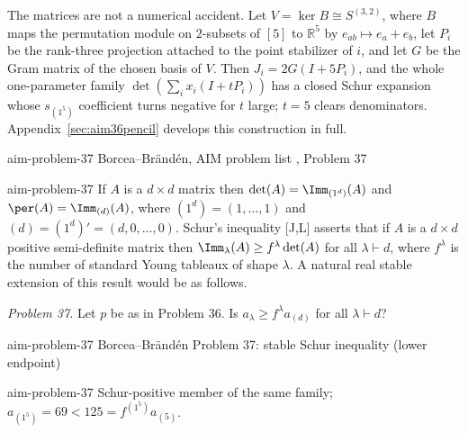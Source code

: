 \begin{cxrefutation}
\begin{remark}
The matrices are not a numerical accident.  Let $V=\ker B\cong S^{(3,2)}$, where $B$ maps the permutation module on $2$-subsets of $[5]$ to $\mathbb R^5$ by $e_{ab}\mapsto e_a+e_b$, let $P_i$ be the rank-three projection attached to the point stabilizer of $i$, and let $G$ be the Gram matrix of the chosen basis of $V$.  Then $J_i=2G(I+5P_i)$, and the whole one-parameter family $\det(\sum_ix_i(I+tP_i))$ has a closed Schur expansion whose $s_{(1^5)}$ coefficient turns negative for $t$ large; $t=5$ clears denominators.  Appendix~\ref{sec:aim36pencil} develops this construction in full.
\end{remark}

\end{cxrefutation}


\begin{cxsource}{aim-problem-37}
Borcea--Br\"and\'en, AIM problem list \citeyearpar{AIMStableProblems}, Problem 37
\end{cxsource}

\begin{cxstatement}{aim-problem-37}
If $A$ is a $d\times d$ matrix then $\det(A)=\Imm_{(1^d)}(A)$ and $\per(A)=\Imm_{(d)}(A)$, where $(1^d)=(1,\ldots,1)$ and $(d)=(1^d)'=(d,0,\ldots,0)$.  Schur's inequality [J,L] asserts that if $A$ is a $d\times d$ positive semi-definite matrix then $\Imm_\lambda(A)\ge f^\lambda\det(A)$ for all $\lambda\vdash d$, where $f^\lambda$ is the number of standard Young tableaux of shape $\lambda$.  A natural real stable extension of this result would be as follows.

\emph{Problem 37.}  Let $p$ be as in Problem 36.  Is $a_\lambda\ge f^\lambda a_{(d)}$ for all $\lambda\vdash d$?
\end{cxstatement}

\begin{cxsummary}{aim-problem-37}
Borcea--Br\"and\'en Problem 37: stable Schur inequality (lower endpoint) \citeyearpar{AIMStableProblems}
\end{cxsummary}

\begin{cxcertificate}{aim-problem-37}
Schur-positive member of the same family; $a_{(1^5)}=69<125=f^{(1^5)}a_{(5)}$.
\end{cxcertificate}

\begin{cxcredits}
\end{cxcredits}


